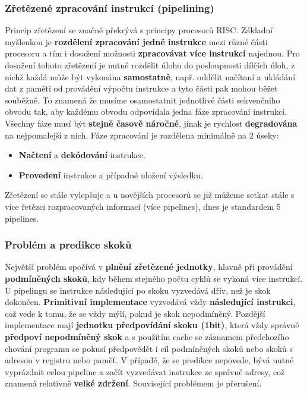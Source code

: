 \subsubsection{Zřetězené zpracování instrukcí (pipelining)}
Princip zřetězení se značně překrývá s principy procesorů RISC.
 Základní myšlenkou je \textbf{rozdělení zpracování jedné instrukce} mezi různé části procesoru a tím i dosažení možnosti \textbf{zpracovávat} \textbf{více instrukcí }najednou. Pro dosažení tohoto zřetězení je nutné rozdělit úlohu do posloupnosti dílčích úloh, z nichž každá může být vykonána \textbf{samostatně}, např. oddělit načítaní a ukládání dat z paměti od provádění výpočtu instrukce a tyto části pak mohou běžet souběžně. To znamená že musíme osamostatnit jednotlivé části sekvenčního obvodu tak, aby každému obvodu odpovídala jedna fáze zpracování instrukcí. Všechny fáze musí být \textbf{stejně časově náročné}, jinak je rychlost \textbf{degradována} na nejpomalejší z nich. Fáze zpracování je rozdělena minimálně na 2 úseky:
\begin{itemize}
\item \textbf{Načtení} a \textbf{dekódování} instrukce.
\item \textbf{Provedení} instrukce a případné uložení výsledku.
\end{itemize}
Zřetězení se stále vylepšuje a u novějších procesorů se již můžeme setkat stále s více řetězci rozpracovaných informací (více pipelines), dnes je standardem 5 pipelines.

\subsubsection{Problém a predikce skoků}
Největší problém spočívá v \textbf{plnění zřetězené jednotky}, hlavně při provádění \textbf{podmíněných skoků}, kdy během stejného počtu cyklů se vykoná více instrukcí. U pipelingu se instrukce následující po skoku vyzvedává dřív, než je skok dokončen. \textbf{Primitivní implementace} vyzvedává vždy \textbf{následující instrukci}, což vede k tomu, že se vždy mýlí, pokud je skok nepodmíněný. Pozdější implementace mají \textbf{jednotku předpovídání skoku (1bit)}, která vždy správně \textbf{předpoví nepodmíněný skok} a s použitím cache se záznamem předchozího chování programu se pokusí předpovědět i cíl podmíněných skoků nebo skoků s adresou v registru nebo paměť. V případě, že se predikce nepovede, bývá nutné vyprázdnit celou pipeline a začít vyzvedávat instrukce ze správné adresy, což znamená relativně \textbf{velké zdržení}. Související problémem je přerušení.

